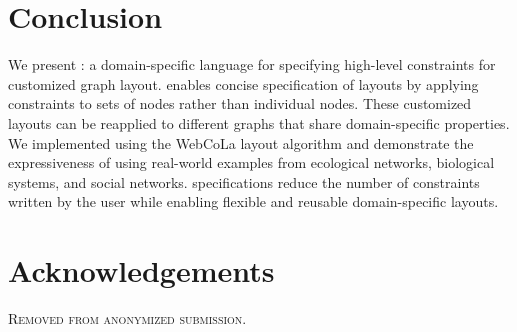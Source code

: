 \section{Conclusion}
We present \projectname: a domain-specific language for specifying high-level
constraints for customized graph layout. \projectname enables concise 
specification of layouts by applying constraints to sets
of nodes rather than individual nodes. These customized layouts can
be reapplied to different graphs that share domain-specific properties.
We implemented \projectname using the WebCoLa layout algorithm and demonstrate the expressiveness
of \projectname using real-world examples from ecological networks,
biological systems, and social networks. \projectname specifications reduce the
number of constraints written by the user while enabling flexible and reusable
domain-specific layouts.

\section*{Acknowledgements}
\textsc{Removed from anonymized submission.}

